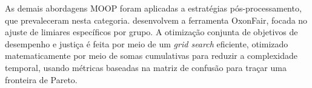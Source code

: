 As demais abordagens MOOP foram aplicadas a estratégias pós-processamento, que prevaleceram nesta categoria. \citet{delaney2024oxonfair} desenvolvem a ferramenta OxonFair,
focada no ajuste de limiares específicos por grupo. A otimização conjunta de objetivos de desempenho e justiça é feita por meio de um \textit{grid search} eficiente, otimizado matematicamente por meio de somas cumulativas para reduzir a complexidade temporal, usando métricas baseadas na matriz de confusão para traçar uma fronteira de Pareto.

